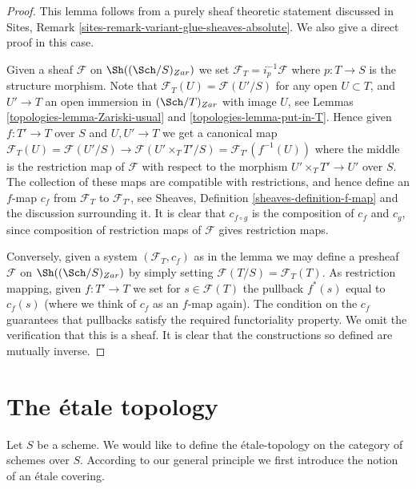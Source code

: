 \begin{proof}

This lemma follows from a purely sheaf theoretic statement discussed
in Sites, Remark \ref{sites-remark-variant-glue-sheaves-absolute}.
We also give a direct proof in this case.

\medskip\noindent
Given a sheaf $\mathcal{F}$ on $\Sh((\Sch/S)_{Zar})$
we set $\mathcal{F}_T = i_p^{-1}\mathcal{F}$ where $p : T \to S$
is the structure morphism. Note that
$\mathcal{F}_T(U) = \mathcal{F}(U'/S)$ for any open $U \subset T$,
and $U' \to T$ an open immersion in $(\Sch/T)_{Zar}$
with image $U$, see Lemmas \ref{topologies-lemma-Zariski-usual} and \ref{topologies-lemma-put-in-T}.
Hence given $f : T' \to T$ over $S$ and $U, U' \to T$ we get a canonical
map $\mathcal{F}_T(U) = \mathcal{F}(U'/S) \to \mathcal{F}(U'\times_T T'/S)
= \mathcal{F}_{T'}(f^{-1}(U))$ where the middle is the restriction map
of $\mathcal{F}$ with respect to the morphism
$U' \times_T T' \to U'$ over $S$. The collection of these maps are
compatible with restrictions, and hence define an $f$-map $c_f$
from $\mathcal{F}_T$ to $\mathcal{F}_{T'}$, see
Sheaves, Definition \ref{sheaves-definition-f-map} and the discussion
surrounding it. It is clear that $c_{f \circ g}$ is the composition of
$c_f$ and $c_g$, since composition of restriction maps of $\mathcal{F}$
gives restriction maps.

\medskip\noindent
Conversely, given a system $(\mathcal{F}_T, c_f)$ as in the lemma
we may define a presheaf $\mathcal{F}$ on $\Sh((\Sch/S)_{Zar})$
by simply setting $\mathcal{F}(T/S) = \mathcal{F}_T(T)$. As restriction
mapping, given $f : T' \to T$ we set for $s \in \mathcal{F}(T)$
the pullback $f^*(s)$ equal to $c_f(s)$ (where we think of $c_f$ as
an $f$-map again). The condition on the $c_f$ guarantees that
pullbacks satisfy the required functoriality property.
We omit the verification that this is a sheaf.
It is clear that the constructions so defined are mutually inverse.
\end{proof}

\section{The \'etale topology}
\label{topologies-section-etale}
Let $S$ be a scheme. We would like to define the \'etale-topology on
the category of schemes over $S$. According to our general principle
we first introduce the notion of an \'etale covering.

